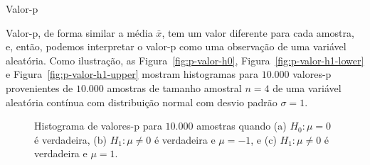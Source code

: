 \documentclass[8pt]{beamer}
\begin{document}
\begin{frame}{Valor-p}



Valor-p, de forma similar a média $\bar{x}$, tem um valor diferente para cada amostra, e, então, podemos interpretar o valor-p como uma observação de uma variável aleatória. Como ilustração, as Figura~\ref{fig:p-valor-h0},  Figura~\ref{fig:p-valor-h1-lower} e Figura~\ref{fig:p-valor-h1-upper} mostram histogramas para $10.000$ valores-p provenientes de $10.000$ amostras de tamanho amostral $n=4$ de uma variável aleatória contínua com distribuição normal com desvio padrão $\sigma=1$.

\begin{figure}[htbp]
	\centering
	\caption{ Histograma de valores-p para $10.000$ amostras quando (a) $H_0: \mu=0$ é verdadeira, (b) $H_1: \mu \neq 0$ é verdadeira e $\mu=-1$, e (c)  $H_1: \mu \neq 0$ é verdadeira e $\mu=1$.}
\end{figure}
\normalsize


\end{frame}
\end{document}
